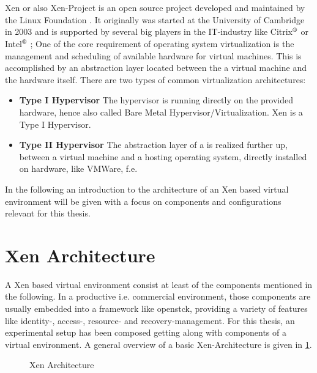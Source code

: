 \\~\\
Xen or also Xen-Project is an open source project developed and maintained by the Linux Foundation
. It originally was started at the University of Cambridge in 2003 and is supported by several 
big players in the IT-industry like Citrix$^\text{\textregistered}$ or Intel$^\text{\textregistered}$ \cite{xenprjct}; One of the core requirement of operating system virtualization is the management and scheduling of available hardware for virtual machines. This is accomplished by an abstraction layer located between the a virtual machine and the hardware itself. There are two types of common virtualization architectures:

\begin{itemize}
	\item \textbf{Type I Hypervisor} The hypervisor is running directly on the provided hardware, hence also called Bare Metal Hypervisor/Virtualization. Xen is a Type I Hypervisor. 
	\item \textbf{Type II Hypervisor} The abstraction layer of a is realized further up, between a virtual machine and a hosting operating system, directly installed on hardware, like VMWare, f.e. 
\end{itemize}

In the following an introduction to the architecture of an Xen based virtual environment will be given with a focus on components and configurations relevant for this thesis. 

\section{Xen Architecture}
A Xen based virtual environment consist at least of the components mentioned in the following. In a productive i.e. commercial environment, those components are usually embedded into a framework like \gls{openstck}, providing a variety of features like identity-, access-, resource- and recovery-management. For this thesis, an experimental setup has been composed getting along with components of a virtual environment. A general overview of a basic Xen-Architecture is given in \ref{fig:xen-arch}.

\begin{figure}[H]
	\centering
	
	\caption{Xen Architecture} \label{fig:xen-arch}
\end{figure}


